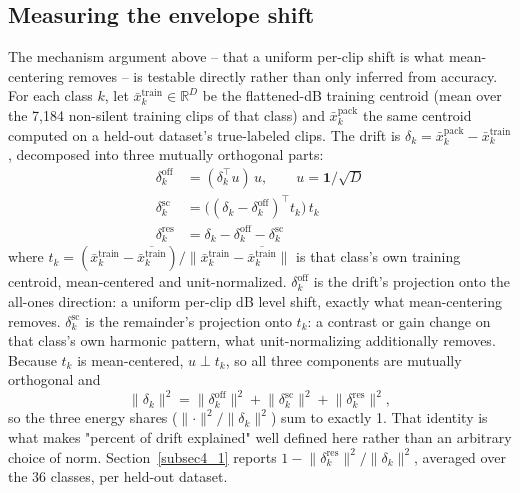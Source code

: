 \documentclass[pdflatex,sn-mathphys-num,iicol]{sn-jnl}
\theoremstyle{thmstyleone}
\theoremstyle{thmstyletwo}
\theoremstyle{thmstylethree}
\begin{document}
\subsection{Measuring the envelope shift}\label{subsec3_drift}

The mechanism argument above -- that a uniform per-clip shift is what mean-centering removes -- is testable directly rather than only inferred from accuracy. For each class $k$, let $\bar x^{\text{train}}_k \in \mathbb{R}^D$ be the flattened-dB training centroid (mean over the 7{,}184 non-silent training clips of that class) and $\bar x^{\text{pack}}_k$ the same centroid computed on a held-out dataset's true-labeled clips. The drift is $\delta_k = \bar x^{\text{pack}}_k - \bar x^{\text{train}}_k$, decomposed into three mutually orthogonal parts:
\begin{align}
\delta_k^{\text{off}} &= (\delta_k^\top u)\,u, \qquad u = \mathbf{1}/\sqrt{D} \label{eq:off}\\
\delta_k^{\text{sc}} &= \big((\delta_k - \delta_k^{\text{off}})^\top t_k\big)\,t_k \label{eq:sc}\\
\delta_k^{\text{res}} &= \delta_k - \delta_k^{\text{off}} - \delta_k^{\text{sc}} \label{eq:res}
\end{align}
where $t_k = (\bar x^{\text{train}}_k - \overline{\bar x^{\text{train}}_k}) / \lVert \bar x^{\text{train}}_k - \overline{\bar x^{\text{train}}_k} \rVert$ is that class's own training centroid, mean-centered and unit-normalized. $\delta_k^{\text{off}}$ is the drift's projection onto the all-ones direction: a uniform per-clip dB level shift, exactly what mean-centering removes. $\delta_k^{\text{sc}}$ is the remainder's projection onto $t_k$: a contrast or gain change on that class's own harmonic pattern, what unit-normalizing additionally removes. Because $t_k$ is mean-centered, $u \perp t_k$, so all three components are mutually orthogonal and
\begin{equation}
\lVert\delta_k\rVert^2 = \lVert\delta_k^{\text{off}}\rVert^2 + \lVert\delta_k^{\text{sc}}\rVert^2 + \lVert\delta_k^{\text{res}}\rVert^2,
\label{eq:pythagoras}
\end{equation}
so the three energy shares ($\lVert\cdot\rVert^2/\lVert\delta_k\rVert^2$) sum to exactly 1. That identity is what makes "percent of drift explained" well defined here rather than an arbitrary choice of norm. Section~\ref{subsec4_1} reports $1 - \lVert\delta_k^{\text{res}}\rVert^2/\lVert\delta_k\rVert^2$, averaged over the 36 classes, per held-out dataset.
\end{document}
